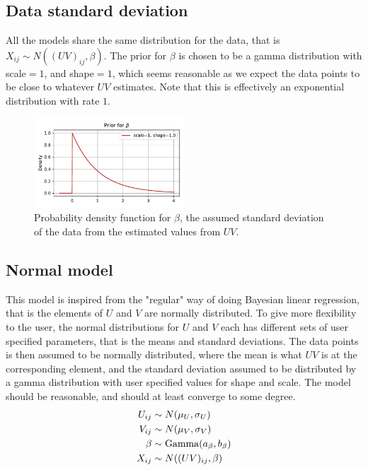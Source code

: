 \documentclass[12pt]{article}
\begin{document}
    \subsection*{Data standard deviation}
        All the models share the same distribution for the data, that is $X_{ij}\sim N((UV)_{ij}, \beta)$. The prior for $\beta$ is chosen to be a gamma distribution with scale$=1$, and shape$=1$, which seems reasonable as we expect the data points to be close to whatever $UV$ estimates. Note that this is effectively an exponential distribution with rate $1$.
    
        \begin{figure}[H]
            \centering
            \includegraphics[width=0.5\textwidth]{betaprior.pdf}
            \caption{Probability density function for $\beta$, the assumed standard deviation of the data from the estimated values from $UV$.}
        \end{figure}
    
    \subsection{Normal model}
    This model is inspired from the "regular" way of doing Bayesian linear regression, that is the elements of $U$ and $V$ are normally distributed. To give more flexibility to the user, the normal distributions for $U$ and $V$ each has different sets of user specified parameters, that is the means and standard deviations. The data points is then assumed to be normally distributed, where the mean is what $UV$ is at the corresponding element, and the standard deviation assumed to be distributed by a gamma distribution with user specified values for shape and scale. The model should be reasonable, and should at least converge to some degree. 
    \begin{align*}
        U_{ij}  &\sim N(\mu_U, \sigma_U) \\
        V_{ij}  &\sim N(\mu_V, \sigma_V) \\
        \beta  &\sim \operatorname{Gamma}(a_\beta, b_\beta) \\
        X_{ij} &\sim N((UV)_{ij}, \beta) 
    \end{align*}
\end{document}
